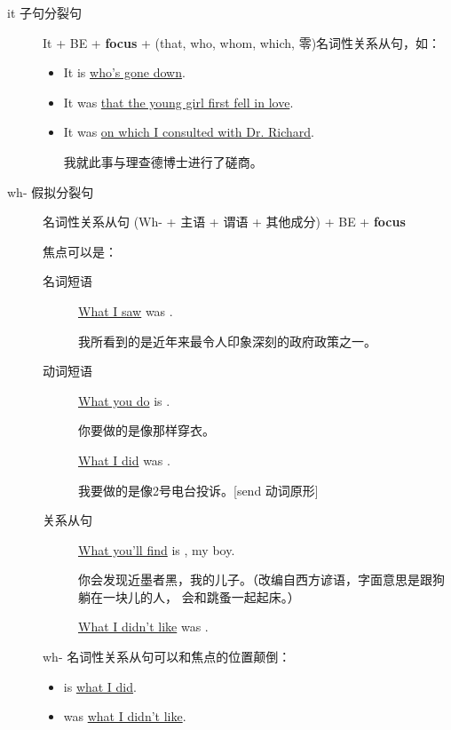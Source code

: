 \begin{description}
\item[it 子句分裂句] It + BE + \textbf{focus} + (that, who, whom,
  which, 零)名词性关系从句，如：
  \begin{itemize}
  \item It is  \uline{who’s gone down}.

  \item It was  \uline{that the young girl first fell in love}.


  \item It was  \uline{on which I consulted with Dr. Richard}.

    我就此事与理查德博士进行了磋商。
  \end{itemize}


\item[wh- 假拟分裂句] 名词性关系从句 (Wh- + 主语 + 谓语 + 其他成分) + BE + \textbf{focus}

  焦点可以是：
  \begin{description}
  \item[名词短语] \uline{What I saw} was .

    我所看到的是近年来最令人印象深刻的政府政策之一。
  \item[动词短语] \uline{What you do} is .

    你要做的是像那样穿衣。

   \uline{What I did} was .

   我要做的是像2号电台投诉。[send 动词原形]

 \item[关系从句]
   \uline{What you’ll find} is , my boy.

   你会发现近墨者黑，我的儿子。（改编自西方谚语，字面意思是跟狗躺在一块儿的人，
   会和跳蚤一起起床。）

   \uline{What I didn’t like} was .

  \end{description}

  wh- 名词性关系从句可以和焦点的位置颠倒：
  \begin{itemize}
  \item {} is \uline{what I did}.

  \item {} was \uline{what I didn’t like}.
  \end{itemize}
\end{description}

